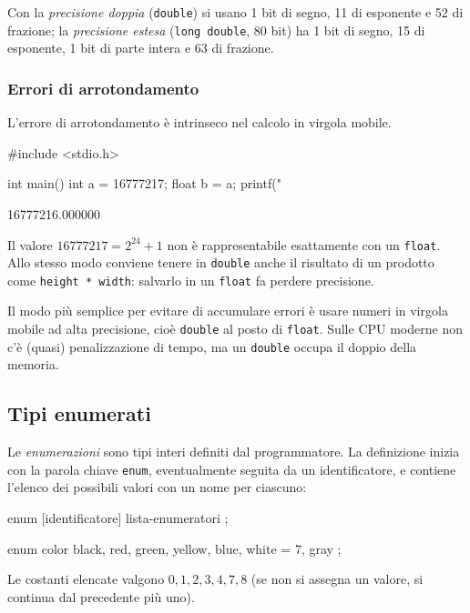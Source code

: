 \documentclass[11pt,a4paper]{article}
\begin{document}
Con la \emph{precisione doppia} (\lstinline|double|) si usano 1 bit di segno,
11 di esponente e 52 di frazione; la \emph{precisione estesa}
(\lstinline|long double|, 80 bit) ha 1 bit di segno, 15 di esponente, 1 bit di
parte intera e 63 di frazione.

\subsubsection{Errori di arrotondamento}

L'errore di arrotondamento è intrinseco nel calcolo in virgola mobile.

\begin{codice}
#include <stdio.h>

int main() {
    int a = 16777217;
    float b = a;
    printf("%
}
\end{codice}
\begin{risultato}
16777216.000000
\end{risultato}

Il valore $16777217 = 2^{24} + 1$ non è rappresentabile esattamente con un
\lstinline|float|. Allo stesso modo conviene tenere in \lstinline|double| anche
il risultato di un prodotto come \lstinline|height * width|: salvarlo in un
\lstinline|float| fa perdere precisione.

\begin{osservazione}
Il modo più semplice per evitare di accumulare errori è usare numeri in virgola
mobile ad alta precisione, cioè \lstinline|double| al posto di \lstinline|float|.
Sulle CPU moderne non c'è (quasi) penalizzazione di tempo, ma un \lstinline|double|
occupa il doppio della memoria.
\end{osservazione}

\subsection{Tipi enumerati}

Le \emph{enumerazioni} sono tipi interi definiti dal programmatore. La definizione
inizia con la parola chiave \lstinline|enum|, eventualmente seguita da un
identificatore, e contiene l'elenco dei possibili valori con un nome per ciascuno:
\begin{codice}
enum [identificatore] { lista-enumeratori };
\end{codice}

\begin{esempio}
\begin{codice}
enum color { black, red, green, yellow, blue, white = 7, gray };
\end{codice}
Le costanti elencate valgono $0, 1, 2, 3, 4, 7, 8$ (se non si assegna un valore,
si continua dal precedente più uno).
\end{esempio}
\end{document}
